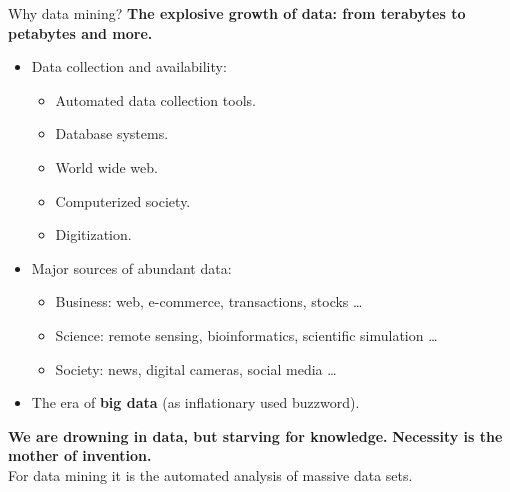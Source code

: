 \documentclass[aspectratio=169,t]{beamer}
\begin{document}
  { 
    \begin{frame}{Why data mining?}
    \textbf{The explosive growth of data: from terabytes to petabytes and more.}\\
        \begin{itemize}
            \item Data collection and availability:
                \begin{itemize}
                    \item Automated data collection tools.
                    \item Database systems.
                    \item World wide web.
                    \item Computerized society.
                    \item Digitization.
                \end{itemize}
            \item Major sources of abundant data:
                \begin{itemize}
                    \item Business: web, e-commerce, transactions, stocks \ldots
                    \item Science: remote sensing, bioinformatics, scientific simulation \ldots
                    \item Society: news, digital cameras, social media \ldots
                \end{itemize}
            \item The era of \textbf{big data} (as inflationary used buzzword).
        \end{itemize}
    \textbf{We are drowning in data, but starving for knowledge.} \textbf{Necessity is the mother of invention.}\\
    For data mining it is the automated analysis of massive data sets.
    \end{frame}
  }
\end{document}
